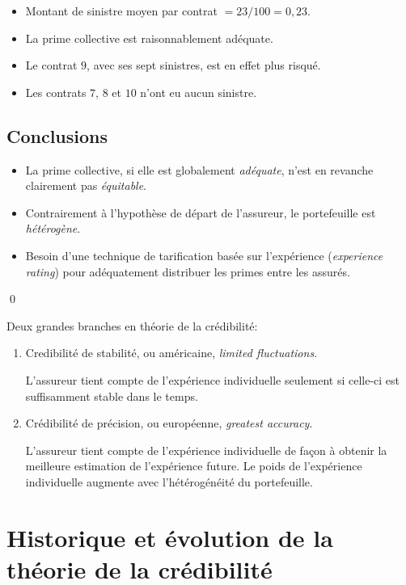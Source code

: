 \begin{exemple}
\begin{itemize}
\item Montant de sinistre moyen par contrat $= 23/100 = 0,23$.
\item La prime collective est raisonnablement adéquate.
\item Le contrat $9$, avec ses sept sinistres, est en effet plus risqué.
\item Les contrats $7$, $8$ et $10$ n'ont eu aucun sinistre.
\end{itemize}



\subsection*{Conclusions}

\begin{itemize}
\item La prime collective, si elle est globalement \emph{adéquate},
  n'est en revanche clairement pas \emph{équitable}.
\item Contrairement à l'hypothèse de départ de l'assureur, le
  portefeuille est \emph{hétérogène}.
\item Besoin d'une technique de tarification basée sur l'expérience
  (\emph{experience rating}) pour adéquatement distribuer les primes
  entre les assurés.
\end{itemize}
  \qed
\end{exemple}

Deux grandes branches en théorie de la crédibilité:
\begin{enumerate}
\item Credibilité de stabilité, ou américaine, \emph{limited
    fluctuations}.

  L'assureur tient compte de l'expérience individuelle seulement si
  celle-ci est suffisamment stable dans le temps.

\item Crédibilité de précision, ou européenne, \emph{greatest
    accuracy}.

  L'assureur tient compte de l'expérience individuelle de façon à
  obtenir la meilleure estimation de l'expérience future. Le poids de
  l'expérience individuelle augmente avec l'hétérogénéité du
  portefeuille.
\end{enumerate}


\section{Historique et évolution de la théorie de la crédibilité}
\label{sec:introduction-historique:historique}

